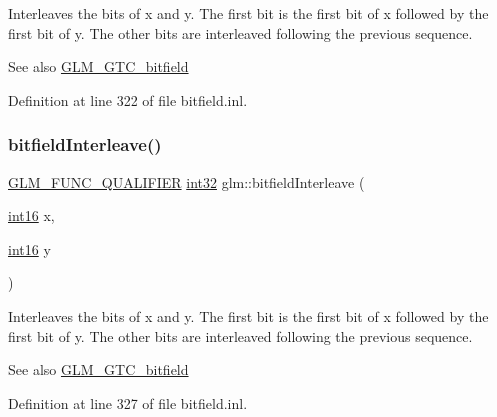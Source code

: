 Interleaves the bits of x and y. The first bit is the first bit of x followed by the first bit of y. The other bits are interleaved following the previous sequence.

\begin{DoxySeeAlso}{See also}
\mbox{\hyperlink{group__gtc__bitfield}{G\+L\+M\+\_\+\+G\+T\+C\+\_\+bitfield}} 
\end{DoxySeeAlso}


Definition at line 322 of file bitfield.\+inl.

\mbox{\label{group__gtc__bitfield_ga1a0264598647ae00a596865af4e1e878}} 
\subsubsection{\texorpdfstring{bitfieldInterleave()}{bitfieldInterleave()}\hspace{0.1cm}{\footnotesize\ttfamily [3/16]}}
{\footnotesize\ttfamily \mbox{\hyperlink{setup_8hpp_a33fdea6f91c5f834105f7415e2a64407}{G\+L\+M\+\_\+\+F\+U\+N\+C\+\_\+\+Q\+U\+A\+L\+I\+F\+I\+ER}} \mbox{\hyperlink{group__gtc__type__precision_ga632d8b25f6b61659f39ea4321fab92a4}{int32}} glm\+::bitfield\+Interleave (\begin{DoxyParamCaption}\item[{\mbox{\hyperlink{group__gtc__type__precision_ga2945a61d12771f8954994fcddf02b021}{int16}}}]{x,  }\item[{\mbox{\hyperlink{group__gtc__type__precision_ga2945a61d12771f8954994fcddf02b021}{int16}}}]{y }\end{DoxyParamCaption})}

Interleaves the bits of x and y. The first bit is the first bit of x followed by the first bit of y. The other bits are interleaved following the previous sequence.

\begin{DoxySeeAlso}{See also}
\mbox{\hyperlink{group__gtc__bitfield}{G\+L\+M\+\_\+\+G\+T\+C\+\_\+bitfield}} 
\end{DoxySeeAlso}


Definition at line 327 of file bitfield.\+inl.

\mbox{\label{group__gtc__bitfield_ga19ef8360379483e3ee245e89cb62ff93}} 
